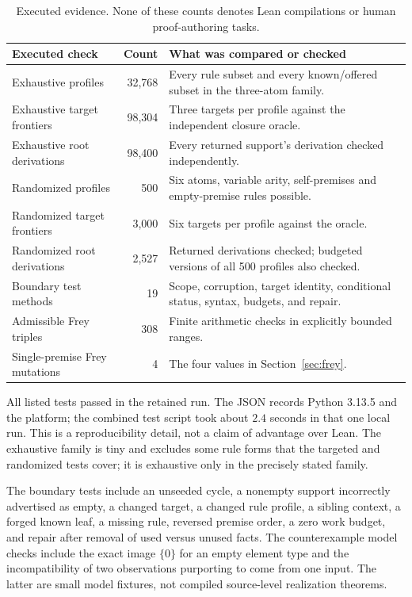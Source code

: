 \documentclass[11pt,a4paper]{article}
\theoremstyle{definition}
\theoremstyle{remark}
\begin{document}
\begin{table}[htbp]
\centering\small
\begin{tabularx}{\textwidth}{@{}Y r Y@{}}
\toprule Executed check & Count & What was compared or checked\\\midrule
Exhaustive profiles & 32,768 & Every rule subset and every known/offered subset in the three-atom family.\\
Exhaustive target frontiers & 98,304 & Three targets per profile against the independent closure oracle.\\
Exhaustive root derivations & 98,400 & Every returned support's derivation checked independently.\\
Randomized profiles & 500 & Six atoms, variable arity, self-premises and empty-premise rules possible.\\
Randomized target frontiers & 3,000 & Six targets per profile against the oracle.\\
Randomized root derivations & 2,527 & Returned derivations checked; budgeted versions of all 500 profiles also checked.\\
Boundary test methods & 19 & Scope, corruption, target identity, conditional status, syntax, budgets, and repair.\\
Admissible Frey triples & 308 & Finite arithmetic checks in explicitly bounded ranges.\\
Single-premise Frey mutations & 4 & The four values in Section~\ref{sec:frey}.\\
\bottomrule
\end{tabularx}
\caption{Executed evidence. None of these counts denotes Lean compilations or human proof-authoring tasks.}\label{tab:tests}
\end{table}

All listed tests passed in the retained run. The JSON records Python 3.13.5 and the platform; the combined test script took about $2.4$ seconds in that one local run. This is a reproducibility detail, not a claim of advantage over Lean. The exhaustive family is tiny and excludes some rule forms that the targeted and randomized tests cover; it is exhaustive only in the precisely stated family.

The boundary tests include an unseeded cycle, a nonempty support incorrectly advertised as empty, a changed target, a changed rule profile, a sibling context, a forged known leaf, a missing rule, reversed premise order, a zero work budget, and repair after removal of used versus unused facts. The counterexample model checks include the exact image $\{0\}$ for an empty element type and the incompatibility of two observations purporting to come from one input. The latter are small model fixtures, not compiled source-level realization theorems.
\end{document}
